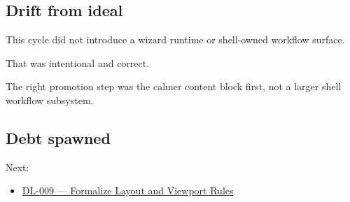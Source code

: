 \subsection{Drift from ideal}\label{record-175-drift-from-ideal}

This cycle did not introduce a wizard runtime or shell-owned workflow surface.

That was intentional and correct.

The right promotion step was the calmer content block first, not a larger shell workflow subsystem.

\subsection{Debt spawned}\label{record-175-debt-spawned}

Next:

\begin{itemize}
\tightlist
\item
  \href{https://github.com/flyingrobots/bijou/blob/cbd70612140e7a450d764b3c7be1c6af878b99bc/docs/method/graveyard/legacy-backlog/v5.0.0/DL-009-formalize-layout-and-viewport-rules.md}{DL-009 --- Formalize Layout and Viewport Rules}
\end{itemize}

